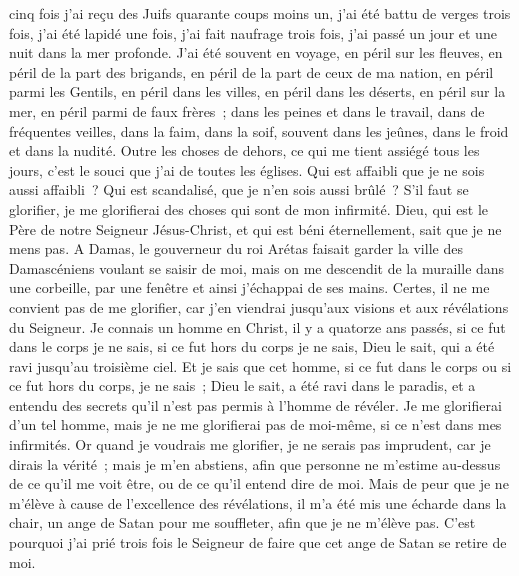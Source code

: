 \begin{multicols}{2}
cinq fois j'ai reçu des Juifs quarante coups moins un,
j'ai été battu de verges trois fois, j'ai été lapidé une fois, j'ai fait naufrage trois fois, j'ai passé un jour et une nuit dans la mer profonde.
J'ai été souvent en voyage, en péril sur les fleuves, en péril de la part des brigands, en péril de la part de ceux de ma nation, en péril parmi les Gentils, en péril dans les villes, en péril dans les déserts, en péril sur la mer, en péril parmi de faux frères~;
dans les peines et dans le travail, dans de fréquentes veilles, dans la faim, dans la soif, souvent dans les jeûnes, dans le froid et dans la nudité.
Outre les choses de dehors, ce qui me tient assiégé tous les jours, c'est le souci que j'ai de toutes les églises.
Qui est affaibli que je ne sois aussi affaibli~? Qui est scandalisé, que je n'en sois aussi brûlé~?
S'il faut se glorifier, je me glorifierai des choses qui sont de mon infirmité.
Dieu, qui est le Père de notre Seigneur Jésus-Christ, et qui est béni éternellement, sait que je ne mens pas.
A Damas, le gouverneur du roi Arétas faisait garder la ville des Damascéniens voulant se saisir de moi,
mais on me descendit de la muraille dans une corbeille, par une fenêtre et ainsi j'échappai de ses mains.
\VerseOne{}Certes, il ne me convient pas de me glorifier, car j'en viendrai jusqu'aux visions et aux révélations du Seigneur.
Je connais un homme en Christ, il y a quatorze ans passés, si ce fut dans le corps je ne sais, si ce fut hors du corps je ne sais, Dieu le sait, qui a été ravi jusqu'au troisième ciel.
Et je sais que cet homme, si ce fut dans le corps ou si ce fut hors du corps, je ne sais~; Dieu le sait,
a été ravi dans le paradis, et a entendu des secrets qu'il n'est pas permis à l'homme de révéler.
Je me glorifierai d'un tel homme, mais je ne me glorifierai pas de moi-même, si ce n'est dans mes infirmités.
Or quand je voudrais me glorifier, je ne serais pas imprudent, car je dirais la vérité~; mais je m'en abstiens, afin que personne ne m'estime au-dessus de ce qu'il me voit être, ou de ce qu'il entend dire de moi.
Mais de peur que je ne m'élève à cause de l'excellence des révélations, il m'a été mis une écharde dans la chair, un ange de Satan pour me souffleter, afin que je ne m'élève pas.
C'est pourquoi j'ai prié trois fois le Seigneur de faire que cet ange de Satan se retire de moi.

\end{multicols}
